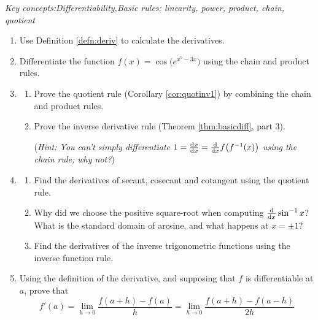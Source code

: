 \begin{exercises}{}
	\emph{Key concepts:\quad Differentiability,\quad Basic rules: linearity, power, product, chain, quotient}
	
	\begin{enumerate}
	  \item Use Definition \ref{defn:deriv} to calculate the derivatives.
	  
	  
	  \item Differentiate the function $f(x)=\cos\bigl(e^{x^5-3x}\bigr)$ using the chain and product rules.
	  
	  
	  \item\begin{enumerate}
	    \item Prove the quotient rule (Corollary \ref{cor:quotinv1}) by combining the chain and product rules.
	  	\item Prove the inverse derivative rule (Theorem \ref{thm:basicdiff}, part 3).\par
	  	(\emph{Hint: You can't simply differentiate $1=\diff[x]x=\diff xf\bigl(f^{-1}(x)\bigr)$ using the chain rule; why not?})
	  \end{enumerate}
	  
	  
	  \item\begin{enumerate}
	    \item Find the derivatives of secant, cosecant and cotangent using the quotient rule.
	    \item Why did we choose the positive square-root when computing $\diff x\sin^{-1}x$? What is the standard domain of arcsine, and what happens at $x=\pm 1$?
	    \item Find the derivatives of the inverse trigonometric functions using the inverse function rule.
	  \end{enumerate}
	  
	  
	  \item\label{ex:hderiv} Using the definition of the derivative, and supposing that $f$ is differentiable at $a$, prove that
	  \[
	  	f'(a)=\lim_{h\to 0}\frac{f(a+h)-f(a)}{h}=\lim_{h\to 0}\frac{f(a+h)-f(a-h)}{2h}
	  \]
	  

\end{enumerate}
\end{exercises}
